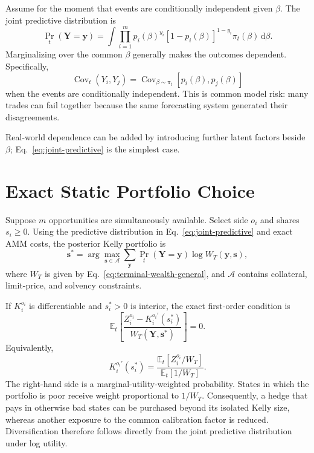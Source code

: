 \documentclass[journal, a4paper]{IEEEtran}
\begin{document}
Assume for the moment that events are conditionally independent given $\beta$. The joint predictive distribution is
\begin{equation}
\Pr_t(\boldsymbol{Y}=\boldsymbol{y})
=
\int
\prod_{i=1}^{m}
 p_i(\beta)^{y_i}
 [1-p_i(\beta)]^{1-y_i}
 \pi_t(\beta)\,\mathrm{d}\beta.
\label{eq:joint-predictive}
\end{equation}
Marginalizing over the common $\beta$ generally makes the outcomes dependent. Specifically,
\begin{equation}
\operatorname{Cov}_t(Y_i,Y_j)
=
\operatorname{Cov}_{\beta\sim\pi_t}
\left[p_i(\beta),p_j(\beta)\right]
\label{eq:model-risk-covariance}
\end{equation}
when the events are conditionally independent. This is common model risk: many trades can fail together because the same forecasting system generated their disagreements.

Real-world dependence can be added by introducing further latent factors beside $\beta$; Eq.~\eqref{eq:joint-predictive} is the simplest case.

\section{Exact Static Portfolio Choice}
Suppose $m$ opportunities are simultaneously available. Select side $o_i$ and shares $s_i\geq0$. Using the predictive distribution in Eq.~\eqref{eq:joint-predictive} and exact AMM costs, the posterior Kelly portfolio is
\begin{equation}
\boldsymbol{s}^{*}
=
\arg\max_{\boldsymbol{s}\in\mathcal{A}}
\sum_{\boldsymbol{y}}
\Pr_t(\boldsymbol{Y}=\boldsymbol{y})
\log W_T(\boldsymbol{y},\boldsymbol{s}),
\label{eq:static-portfolio}
\end{equation}
where $W_T$ is given by Eq.~\eqref{eq:terminal-wealth-general}, and $\mathcal{A}$ contains collateral, limit-price, and solvency constraints.

If $K_i^{o_i}$ is differentiable and $s_i^*>0$ is interior, the exact first-order condition is
\begin{equation}
\mathbb{E}_t
\left[
\frac{Z_i^{o_i}-K_i^{o_i\prime}(s_i^*)}
{W_T(\boldsymbol{Y},\boldsymbol{s}^*)}
\right]
=0.
\label{eq:static-foc}
\end{equation}
Equivalently,
\begin{equation}
K_i^{o_i\prime}(s_i^*)
=
\frac{\mathbb{E}_t[Z_i^{o_i}/W_T]}
{\mathbb{E}_t[1/W_T]}.
\label{eq:marginal-utility-probability}
\end{equation}
The right-hand side is a marginal-utility-weighted probability. States in which the portfolio is poor receive weight proportional to $1/W_T$. Consequently, a hedge that pays in otherwise bad states can be purchased beyond its isolated Kelly size, whereas another exposure to the common calibration factor is reduced. Diversification therefore follows directly from the joint predictive distribution under log utility.
\end{document}
